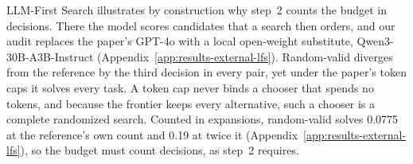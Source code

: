 LLM-First Search \citep{herr2025llmfirst} illustrates by construction why step~2 counts the budget in decisions. There the model scores candidates that a search then orders, and our audit replaces the paper's GPT-4o with a local open-weight substitute, Qwen3-30B-A3B-Instruct (Appendix~\ref{app:results-external-lfs}). Random-valid diverges from the reference by the third decision in every pair, yet under the paper's token caps it solves every task. A token cap never binds a chooser that spends no tokens, and because the frontier keeps every alternative, such a chooser is a complete randomized search. Counted in expansions, random-valid solves 0.0775 at the reference's own count and 0.19 at twice it (Appendix~\ref{app:results-external-lfs}), so the budget must count decisions, as step~2 requires.
